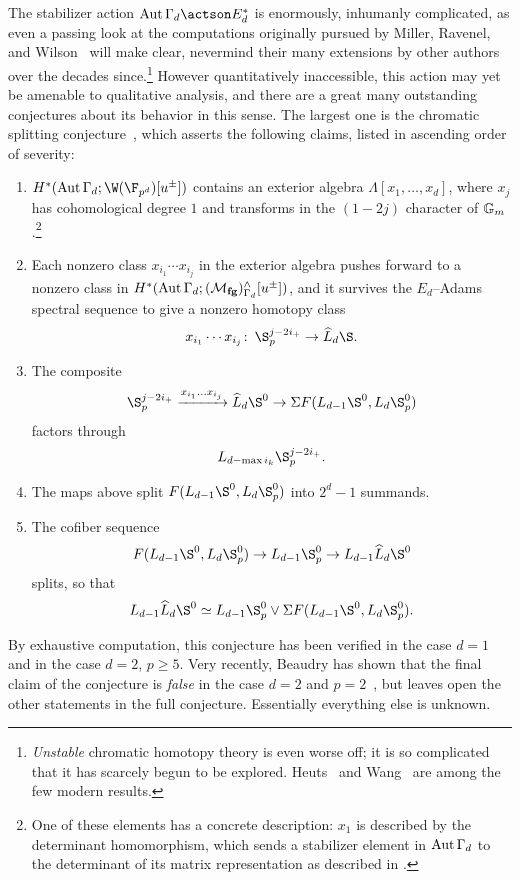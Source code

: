 The stabilizer action \(\Aut \Gamma_d \actson E_d^*\) is enormously, inhumanly complicated, as even a passing look at the computations originally pursued by Miller, Ravenel, and Wilson~\cite{MRW} will make clear, nevermind their many extensions by other authors over the decades since.\footnote{\emph{Unstable} chromatic homotopy theory is even worse off; it is so complicated that it has scarcely begun to be explored.  Heuts~\cite{Heuts} and Wang~\cite{Wang} are among the few modern results.}  However quantitatively inaccessible, this action may yet be amenable to qualitative analysis, and there are a great many outstanding conjectures about its behavior in this sense.  The largest one is the chromatic splitting conjecture~\cite[Conjecture 4.2]{HoveyCSC}, which asserts the following claims, listed in ascending order of severity:
\begin{enumerate}
    \item \(H^*(\Aut \Gamma_d; \W(\F_{p^d})[u^\pm])\) contains an exterior algebra \(\Lambda[x_1, \ldots, x_d]\), where \(x_j\) has cohomological degree \(1\) and transforms in the \((1 - 2j)\){\th} character of \(\mathbb G_m\).\footnote{One of these elements has a concrete description: \(x_1\) is described by the determinant homomorphism, which sends a stabilizer element in \(\operatorname{Aut} \Gamma_d\) to the determinant of its matrix representation as described in .}
    \item Each nonzero class \(x_{i_1} \cdots x_{i_j}\) in the exterior algebra pushes forward to a nonzero class in \(H^*(\operatorname{Aut} \Gamma_d; (\mathcal{M}_{\mathbf{fg}})^\wedge_{\Gamma_d}[u^\pm])\), and it survives the \(E_d\)--Adams spectral sequence to give a nonzero homotopy class \[x_{i_1} \cdots x_{i_j}\co \S_p^{j-2i_+} \to \widehat L_d \S.\]
    \item The composite \[\S_p^{j-2i_+} \xrightarrow{x_{i_1} \ldots x_{i_j}} \widehat L_d \S^0 \to \Susp F(L_{d-1} \S^0, L_d \S_p^0)\] factors through \[L_{d - \max i_k} \S_p^{j-2i_+}.\]
    \item The maps above split \(F(L_{d-1} \S^0, L_d \S^0_p)\) into \(2^d-1\) summands.
    \item The cofiber sequence \[F(L_{d-1} \S^0, L_d \S^0_p) \to L_{d-1} \S^0_p \to L_{d-1} \widehat L_d \S^0\] splits, so that \[L_{d-1} \widehat L_d \S^0 \simeq L_{d-1} \S^0_p \vee \Susp F(L_{d-1} \S^0, L_d \S^0_p).\]
\end{enumerate}
By exhaustive computation, this conjecture has been verified in the case \(d = 1\) and in the case \(d = 2\), \(p \ge 5\).  Very recently, Beaudry has shown that the final claim of the conjecture is \emph{false} in the case \(d = 2\) and \(p = 2\)~\cite{Beaudry}, but leaves open the other statements in the full conjecture.  Essentially everything else is unknown.


